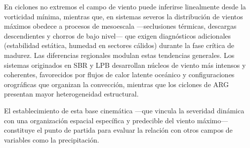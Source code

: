 En ciclones no extremos el campo de viento puede inferirse linealmente desde la vorticidad mínima, mientras que, en sistemas severos la distribución de vientos máximos obedece a procesos de mesoescala —seclusiones térmicas, descargas descendientes y chorros de bajo nivel— que exigen diagnósticos adicionales (estabilidad estática, humedad en sectores cálidos) durante la fase crítica de madurez. Las diferencias regionales modulan estas tendencias generales. Los sistemas originados en SBR y LPB desarrollan núcleos de viento más intensos y coherentes, favorecidos por flujos de calor latente oceánico y configuraciones orográficas que organizan la convección, mientras que los ciclones de ARG presentan mayor heterogeneidad estructural.

El establecimiento de esta base cinemática —que vincula la severidad dinámica con una organización espacial específica y predecible del viento máximo— constituye el punto de partida para evaluar la relación con otros campos de variables como la precipitación.
